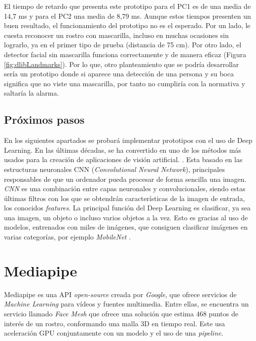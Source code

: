 El tiempo de retardo que presenta este prototipo para el PC1 es de una media de 14,7 ms y para el PC2 una media de 8,79 ms. Aunque estos tiempos presenten un buen resultado, el funcionamiento del prototipo no es el esperado. Por un lado, le cuesta reconocer un rostro con mascarilla, incluso en muchas ocasiones sin lograrlo, ya en el primer tipo de prueba (distancia de 75 cm). Por otro lado, el detector facial sin mascarilla funciona correctamente y de manera eficaz (Figura \ref{fig:dlibLandmarks}). Por lo que, otro planteamiento que se podría desarrollar sería un prototipo donde si aparece una detección de una persona y su boca significa que no viste una mascarilla, por tanto no cumpliría con la normativa y saltaría la alarma.

\vspace{-0.8cm}
\subsection*{Próximos pasos}
\vspace{-0.5cm}
En los siguientes apartados se probará implementar prototipos con el uso de Deep Learning. En las últimas décadas, se ha convertido en uno de los métodos más usados para la creación de aplicaciones de visión artificial. \cite{szeliski_2018}. Esta basado en las estructuras neuronales CNN (\textit{Convolutional Neural Network}), principales responsables de que un ordenador pueda procesar de forma sencilla una imagen. \textit{CNN} es una combinación entre capas neuronales y convolucionales, siendo estas últimas filtros con los que se obtendrán características de la imagen de entrada, los conocidos \textit{features}. La principal función del Deep Learning es clasificar, ya sea una imagen, un objeto o incluso varios objetos a la vez. Esto es gracias al uso de modelos, entrenados con miles de imágenes, que consiguen clasificar imágenes en varias categorías, por ejemplo \textit{MobileNet} \cite{cnn}. 

\newpage
\section{Mediapipe}

Mediapipe es una API \textit{open-source} creada por \textit{Google}, que ofrece servicios de \textit{Machine Learning} para vídeos y fuentes multimedia. Entre ellas, se encuentra un servicio llamado \textit{Face Mesh} que ofrece una solución que estima 468 puntos de interés de un rostro, conformando una malla 3D en tiempo real. Este usa aceleración GPU conjuntamente con un modelo y el uso de una \textit{pipeline}.

